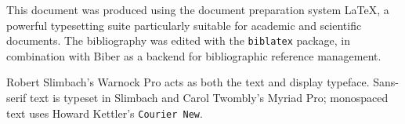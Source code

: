 \noindent
This document was produced using the document preparation system \LaTeX, a powerful typesetting suite particularly suitable for academic and scientific documents. The bibliography was edited with the \texttt{biblatex} package, in combination with Biber as a backend for bibliographic reference management.

Robert Slimbach’s Warnock Pro acts as both the text and display typeface. Sans-serif text is typeset in Slimbach and Carol Twombly’s \textsf{Myriad Pro}; monospaced text uses Howard Kettler’s \texttt{Courier New}.
